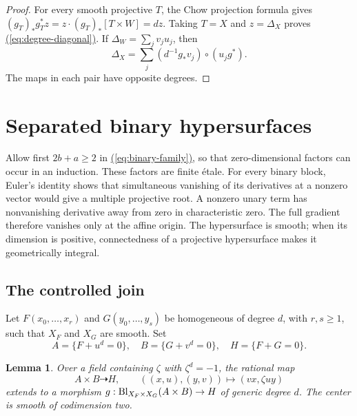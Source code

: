 \documentclass[11pt,a4paper]{article}
\newtheorem{lemma}[theorem]{Lemma}
\theoremstyle{definition}
\theoremstyle{remark}\newtheorem{remark}[theorem]{Remark}
\numberwithin{equation}{section}
\renewcommand{\eqref}[1]{\hyperref[#1]{\textcolor{equationlink}{(\ref*{#1})}}}
\begin{document}
\begin{proof}
For every smooth projective $T$, the Chow projection formula gives
$(g_T)_*g_T^*z=z\cdot(g_T)_*[T\times W]=dz$.
Taking $T=X$ and $z=\Delta_X$ proves \eqref{eq:degree-diagonal}.
If $\Delta_W=\sum_jv_ju_j$, then
\begin{equation}\label{eq:degree-maps}
             \Delta_X=\sum_j(d^{-1}g_*v_j)\circ(u_jg^*).
\end{equation}
The maps in each pair have opposite degrees.
\end{proof}

\section{Separated binary hypersurfaces}\label{sec:binary}

Allow first $2b+a\ge2$ in \eqref{eq:binary-family}, so that
zero-dimensional factors can occur in an induction. These factors
are finite \'etale. For every binary block, Euler's identity
shows that simultaneous vanishing of its derivatives at a nonzero
vector would give a multiple projective root. A nonzero unary
term has nonvanishing derivative away from zero in characteristic
zero. The full gradient therefore vanishes only at the affine
origin. The hypersurface is smooth; when its dimension is positive,
connectedness of a projective hypersurface makes it geometrically
integral.

\subsection{The controlled join}

Let $F(x_0,\ldots,x_r)$ and $G(y_0,\ldots,y_s)$ be homogeneous of
degree $d$, with $r,s\ge1$, such that $X_F$ and $X_G$ are smooth.
Set
\[
 A=\{F+u^d=0\},\quad B=\{G+v^d=0\},\quad H=\{F+G=0\}.
\]

\begin{lemma}\label{lem:join}
Over a field containing $\zeta$ with $\zeta^d=-1$, the rational map
\begin{equation}\label{eq:join-map}
 A\times B\dashrightarrow H,\qquad
 ((x,u),(y,v))\longmapsto(vx,\zeta uy)
\end{equation}
extends to a morphism
$g:\operatorname{Bl}_{X_F\times X_G}(A\times B)\to H$ of generic degree $d$.
The center is smooth of codimension two.
\end{lemma}
\end{document}
